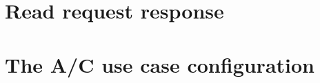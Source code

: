 \appendix
\chapter{Read request response}
\label{chapter:appendixA}



%
%

\chapter{The A/C use case configuration}
\label{chapter:appendix_AC_scripts}


